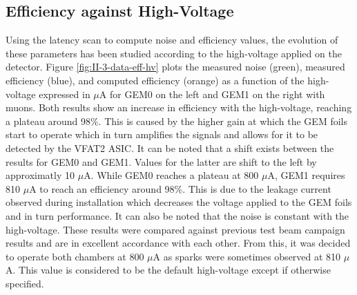     \subsection{Efficiency against High-Voltage}

      Using the latency scan to compute noise and efficiency values, the evolution of these parameters has been studied according to the high-voltage applied on the detector. Figure \ref{fig:II-3-data-eff-hv} plots the measured noise (green), measured efficiency (blue), and computed efficiency (orange) as a function of the high-voltage expressed in $\mu$A for GEM0 on the left and GEM1 on the right with muons. Both results show an increase in efficiency with the high-voltage, reaching a plateau around 98\%. This is caused by the higher gain at which the GEM foils start to operate which in turn amplifies the signals and allows for it to be detected by the VFAT2 ASIC. It can be noted that a shift exists between the results for GEM0 and GEM1. Values for the latter are shift to the left by approximatly 10 $\mu$A. While GEM0 reaches a plateau at 800 $\mu$A, GEM1 requires 810 $\mu$A to reach an efficiency around 98\%. This is due to the leakage current observed during installation which decreases the voltage applied to the GEM foils and in turn performance. It can also be noted that the noise is constant with the high-voltage. These results were compared against previous test beam campaign results \cite{KARCHIN2012561} and are in excellent accordance with each other. From this, it was decided to operate both chambers at 800 $\mu$A as sparks were sometimes observed at 810 $\mu$A. This value is considered to be the default high-voltage except if otherwise specified.

